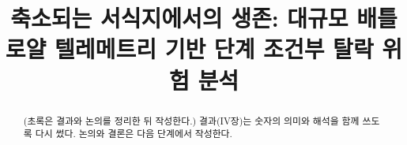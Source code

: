 \documentclass[conference]{IEEEtran}
\newcommand{\rev}[1]{{\color{revblue}#1}}
\begin{document}
\title{축소되는 서식지에서의 생존: 대규모 배틀로얄 텔레메트리 기반 단계 조건부 탈락 위험 분석}
\author{}
\maketitle

\begin{abstract}
(초록은 결과와 논의를 정리한 뒤 작성한다.) \rev{결과(IV장)는 숫자의 의미와 해석을 함께 쓰도록 다시 썼다. 논의와 결론은 다음 단계에서 작성한다.}
\end{abstract}








\end{document}
